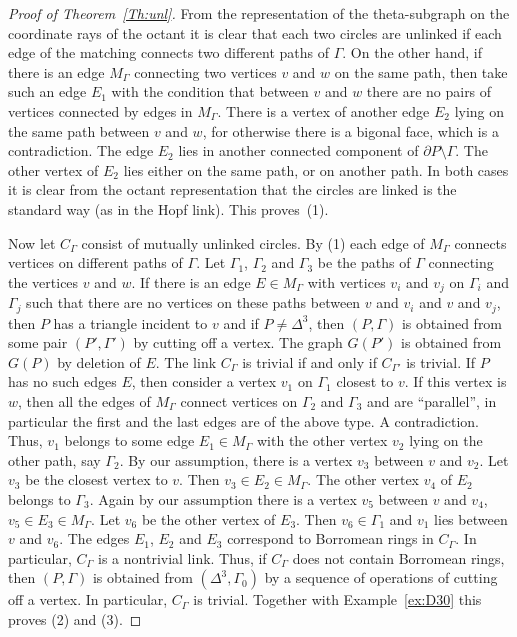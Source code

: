 \documentclass[10pt,a4paper]{amsart}
\theoremstyle{plain}
\theoremstyle{definition}
\theoremstyle{remark}
\begin{document}
\begin{proof}[Proof of Theorem~\ref{Th:unl}]
From the representation of the theta-subgraph on the coordinate rays of the octant 
it is clear that each two circles are unlinked if each edge of the matching connects two different paths of $\Gamma$.
On the other hand, if there is an edge $M_\Gamma$
connecting two vertices $v$ and $w$ on the same path, then take such an edge $E_1$ 
with the condition that between $v$ and $w$ there are no pairs of vertices connected by edges in $M_\Gamma$. 
There is a vertex of another edge $E_2$ lying on the same path between $v$ and $w$, 
for otherwise there is a bigonal face, which is a contradiction. The edge $E_2$ lies 
in another connected component of $\partial P\setminus\Gamma$. The other vertex of $E_2$ lies
either on the same path, or on another path. In both cases it is clear from the octant representation
that the circles are linked is the standard way (as in the Hopf link). This proves~(1).

Now let $C_\Gamma$ consist of mutually unlinked circles. By (1) each edge of $M_{\Gamma}$ connects vertices on different paths
of $\Gamma$. Let $\Gamma_1$, $\Gamma_2$ and $\Gamma_3$ be the paths of $\Gamma$ connecting the vertices $v$ and $w$.
If there is an edge $E\in M_\Gamma$ with vertices $v_i$ and $v_j$ on $\Gamma_i$ and $\Gamma_j$ such that there are no vertices 
on these paths between $v$ and $v_i$ and $v$ and $v_j$,
then $P$ has a triangle incident to $v$ and if $P\ne \Delta^3$, then $(P,\Gamma)$ is obtained from 
some pair $(P',\Gamma')$ by cutting off a vertex.  The graph $G(P')$ is obtained from $G(P)$ by deletion of $E$. 
The link $C_{\Gamma}$ is trivial if and only if $C_{\Gamma'}$ is trivial. If $P$ has no such edges $E$,
then consider a vertex $v_1$ on $\Gamma_1$ closest to $v$. If this vertex is $w$, then all the edges of $M_{\Gamma}$ connect 
vertices on $\Gamma_2$ and $\Gamma_3$ and are ``parallel'', in particular the first and the last edges are of the above type.
A contradiction. Thus, $v_1$ belongs to some edge $E_1\in M_{\Gamma}$ with the other vertex $v_2$ 
lying on the other path, say $\Gamma_2$. By our assumption, there is a vertex $v_3$ between $v$ and $v_2$. Let $v_3$
be the closest vertex to $v$.  Then $v_3\in E_2\in M_\Gamma$. The other vertex $v_4$ of $E_2$ belongs to $\Gamma_3$.
Again by our assumption there is a vertex $v_5$ between $v$ and $v_4$, $v_5\in E_3\in M_\Gamma$. Let $v_6$
be the other vertex of $E_3$. Then $v_6\in \Gamma_1$ and $v_1$ lies between $v$ and $v_6$. The edges $E_1$,
$E_2$ and $E_3$ correspond to Borromean rings in $C_\Gamma$. In particular, $C_\Gamma$ is a nontrivial link.
Thus, if $C_\Gamma$ does not contain Borromean rings, then $(P,\Gamma)$ is obtained from 
$(\Delta^3,\Gamma_0)$ by a sequence of operations of cutting off a vertex. In particular, $C_\Gamma$ is trivial. Together
with Example~\ref{ex:D30} this proves (2) and (3).
\end{proof}
\end{document}
